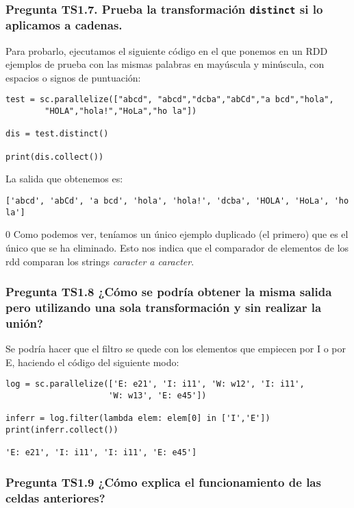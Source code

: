 \documentclass[11pt]{article}
\def\inline{\lstinline[basicstyle=\ttfamily,keywordstyle={}]}
\begin{document}
\subsubsection*{ Pregunta TS1.7. Prueba la transformación \inline{distinct} si lo aplicamos a cadenas.}

Para probarlo, ejecutamos el siguiente código en el que ponemos en un RDD ejemplos de prueba con las mismas palabras en mayúscula y minúscula, con espacios o signos de puntuación:

\begin{verbatim}
test = sc.parallelize(["abcd", "abcd","dcba","abCd","a bcd","hola",
        "HOLA","hola!","HoLa","ho la"])

dis = test.distinct()

print(dis.collect())
\end{verbatim}

La salida que obtenemos es:

\begin{verbatim}
['abcd', 'abCd', 'a bcd', 'hola', 'hola!', 'dcba', 'HOLA', 'HoLa', 'ho la']
\end{verbatim}
0
Como podemos ver, teníamos un único ejemplo duplicado (el primero) que es el único que se ha eliminado. Esto nos indica que el comparador de elementos de los rdd comparan los strings \emph{caracter a caracter}.


\subsubsection*{ Pregunta TS1.8 ¿Cómo se podría obtener la misma salida pero utilizando una sola transformación y sin realizar la unión?}

Se podría hacer que el filtro se quede con los elementos que empiecen por I o por E, haciendo el código del siguiente modo:

\begin{verbatim}
log = sc.parallelize(['E: e21', 'I: i11', 'W: w12', 'I: i11',
                     'W: w13', 'E: e45'])

inferr = log.filter(lambda elem: elem[0] in ['I','E'])
print(inferr.collect())

'E: e21', 'I: i11', 'I: i11', 'E: e45']
\end{verbatim}

\subsubsection*{ Pregunta TS1.9 ¿Cómo explica el funcionamiento de las celdas anteriores?}
\end{document}
